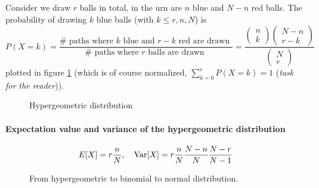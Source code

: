 Consider we draw $r$ balls in total, in the urn are $n$ blue and $N-n$ red balls. The probability of drawing $k$ blue balls (with $k\leq r,n,N$)
is
\begin{equation}
    P(X=k)=\frac{\# \text { paths where } k \text { blue and } r-k \text { red are drawn }}{\# \text { paths where } r \text { balls are drawn }}=\frac{\left(\begin{array}{l}
    n \\
    k
    \end{array}\right)\left(\begin{array}{l}
    N-n \\
    r-k
    \end{array}\right)}{\left(\begin{array}{l}
    N \\
    r
    \end{array}\right)}
\end{equation}
plotted in figure \ref{fig:hypergeom} (which is of course normalized, $\sum_{k=0}^r P(X=k) = 1$ (\textit{task for the reader})).

\begin{figure}[!htb]
    \centering
    
    \caption{Hypergeometric distribution}
    \label{fig:hypergeom}
\end{figure}

\paragraph*{Expectation value and variance of the hypergeometric distribution}
\begin{equation}
    E[X] = r \frac{n}{N}, \quad \operatorname{Var}[X] = r \frac{n}{N} \frac{N-n}{N} \frac{N-r}{N-1}
\end{equation}


\begin{figure}[!htb]
    \centering
    
    \caption{From hypergeometric to binomial to normal distribution.}
    \label{fig:bin_geom_limit}
\end{figure}

